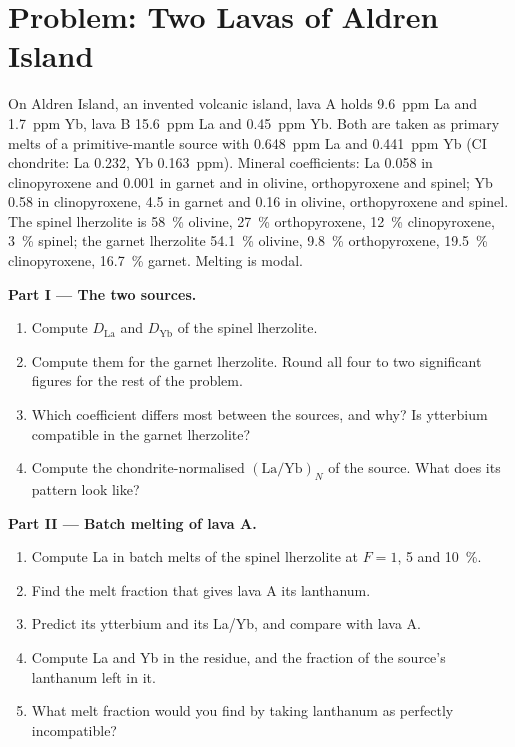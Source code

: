 \section{Problem: Two Lavas of Aldren Island}

\begin{problem}\label{pb:b3:trace-element-modelling:1}
On Aldren Island, an invented volcanic island, lava A holds \qty{9.6}{ppm} La
and \qty{1.7}{ppm} Yb, lava B \qty{15.6}{ppm} La and \qty{0.45}{ppm} Yb.
Both are taken as primary melts of a primitive-mantle source with
\qty{0.648}{ppm} La and \qty{0.441}{ppm} Yb (CI chondrite: La 0.232, Yb
\qty{0.163}{ppm}). Mineral coefficients: La 0.058 in clinopyroxene and 0.001
in garnet and in olivine, orthopyroxene and spinel; Yb 0.58 in
clinopyroxene, 4.5 in garnet and 0.16 in olivine, orthopyroxene and spinel.
The spinel lherzolite is \qty{58}{\percent} olivine, \qty{27}{\percent} orthopyroxene, \qty{12}{\percent}
clinopyroxene, \qty{3}{\percent} spinel; the garnet lherzolite \qty{54.1}{\percent} olivine, \qty{9.8}{\percent}
orthopyroxene, \qty{19.5}{\percent} clinopyroxene, \qty{16.7}{\percent} garnet. Melting is modal.

\medskip\noindent\textbf{Part I --- The two sources.}
\begin{enumerate}
\item Compute $D_{\mathrm{La}}$ and $D_{\mathrm{Yb}}$ of the spinel lherzolite.
\item Compute them for the garnet lherzolite. Round all four to two significant
figures for the rest of the problem.
\item Which coefficient differs most between the sources, and why? Is
ytterbium compatible in the garnet lherzolite?
\item Compute the chondrite-normalised $(\mathrm{La}/\mathrm{Yb})_N$ of the
source. What does its pattern look like?
\end{enumerate}

\medskip\noindent\textbf{Part II --- Batch melting of lava A.}
\begin{enumerate}[resume]
\item Compute La in batch melts of the spinel lherzolite at $F = 1$, 5 and
\qty{10}{\percent}.
\item Find the melt fraction that gives lava A its lanthanum.
\item Predict its ytterbium and its La/Yb, and compare with lava A.
\item Compute La and Yb in the residue, and the fraction of the source's
lanthanum left in it.
\item What melt fraction would you find by taking lanthanum as perfectly
incompatible?
\end{enumerate}


\end{problem}
